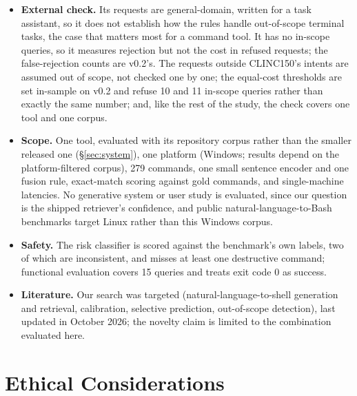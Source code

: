 \begin{itemize}
  out-of-scope counts and AUROC, the ambiguity-detection results and A4/A5. The external check bears on the last
  two: on unscreened requests the shipped score lost its advantage at equal cost, and the detector rejected more,
  not less, than on v0.2. It does not bound either bias, since its population differs.
  \item \textbf{External check.} Its requests are general-domain, written for a task assistant, so it does not
  establish how the rules handle out-of-scope terminal tasks, the case that matters most for a command tool. It has
  no in-scope queries, so it measures rejection but not the cost in refused requests; the false-rejection counts
  are v0.2's. The requests outside CLINC150's intents are assumed out of scope, not checked one by one; the
  equal-cost thresholds are set in-sample on v0.2 and refuse 10 and 11 in-scope queries rather than exactly the
  same number; and, like the rest of the study, the check covers one tool and one corpus.
  \item \textbf{Scope.} One tool, evaluated with its repository corpus rather than the smaller released one
  (\S\ref{sec:system}), one platform (Windows; results depend on the platform-filtered corpus), 279 commands,
  one small sentence encoder and one fusion rule, exact-match scoring against gold commands, and single-machine
  latencies. No generative system or user study is evaluated, since our question is the shipped retriever's
  confidence, and public natural-language-to-Bash benchmarks target Linux rather than this Windows corpus.
  \item \textbf{Safety.} The risk classifier is scored against the benchmark's own labels, two of which are
  inconsistent, and misses at least one destructive command; functional evaluation covers 15 queries and treats exit
  code 0 as success.
  \item \textbf{Literature.} Our search was targeted (natural-language-to-shell generation and retrieval, calibration,
  selective prediction, out-of-scope detection), last updated in October 2026; the novelty claim is limited to the
  combination evaluated here.
\end{itemize}

\section*{Ethical Considerations}

